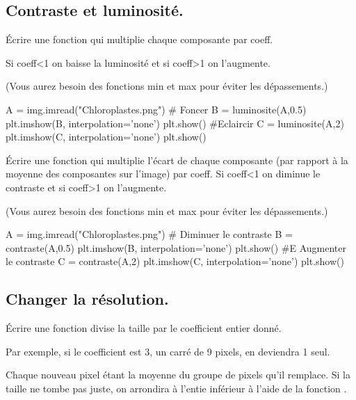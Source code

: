 \documentclass[french,11pt,twoside]{VcCours}
\begin{document}
\subsection{Contraste et luminosité.}
\begin{Exercice}
	Écrire une fonction  qui multiplie chaque composante par coeff.
	
Si coeff<1 on baisse la luminosité et si coeff>1 on l'augmente.

(Vous aurez besoin des fonctions min et max pour éviter les dépassements.)
\end{Exercice}

\begin{PY}
A = img.imread("Chloroplastes.png")
# Foncer
B = luminosite(A,0.5)
plt.imshow(B, interpolation='none')
plt.show()
#Eclaircir
C = luminosite(A,2)
plt.imshow(C, interpolation='none')
plt.show()
\end{PY}

\setcounter{exercices}{\theexercices-1}
\begin{Exercice}
Écrire une fonction  qui multiplie l'écart de chaque composante (par rapport à la moyenne des composantes sur l'image) par coeff.
Si coeff<1 on diminue le contraste et si coeff>1 on l'augmente.

(Vous aurez besoin des fonctions min et max pour éviter les dépassements.)
\end{Exercice}

\begin{PY}
A = img.imread("Chloroplastes.png")
# Diminuer le contraste
B = contraste(A,0.5)
plt.imshow(B, interpolation='none')
plt.show()
#E Augmenter le contraste
C = contraste(A,2)
plt.imshow(C, interpolation='none')
plt.show()
\end{PY}


\subsection{Changer la résolution.}
\begin{Exercice}
	Écrire une fonction  divise la taille par le coefficient entier donné.
	
	Par exemple, si le coefficient est 3, un carré de 9 pixels, en deviendra 1 seul.
	
	Chaque nouveau pixel étant la moyenne du groupe de pixels qu'il remplace. Si la
	taille ne tombe pas juste, on arrondira à l'entie inférieur à l'aide de la
	fonction .
\end{Exercice}
\end{document}
